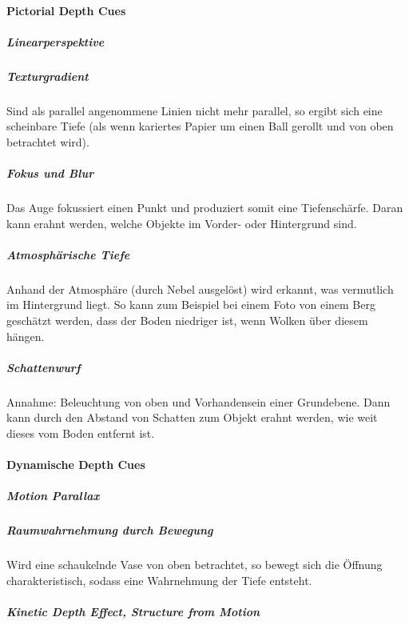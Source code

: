 				\paragraph{Pictorial Depth Cues}
					\subparagraph{Linearperspektive} %

					\subparagraph{Texturgradient}
						Sind als parallel angenommene Linien nicht mehr parallel, so ergibt sich eine scheinbare Tiefe (als wenn kariertes Papier um einen Ball gerollt und von oben betrachtet wird).

					\subparagraph{Fokus und Blur}
						Das Auge fokussiert einen Punkt und produziert somit eine Tiefenschärfe. Daran kann erahnt werden, welche Objekte im Vorder- oder Hintergrund sind.

					\subparagraph{Atmosphärische Tiefe}
						Anhand der Atmosphäre (\zB durch Nebel ausgelöst) wird erkannt, was vermutlich im Hintergrund liegt. So kann zum Beispiel bei einem Foto von einem Berg geschätzt werden, dass der Boden niedriger ist, wenn Wolken über diesem hängen.

					\subparagraph{Schattenwurf}
						Annahme: Beleuchtung von oben und Vorhandensein einer Grundebene. Dann kann durch den Abstand von Schatten zum Objekt erahnt werden, wie weit dieses vom Boden entfernt ist.

				\paragraph{Dynamische Depth Cues}
					\subparagraph{Motion Parallax} %

					\subparagraph{Raumwahrnehmung durch Bewegung}
						Wird \zB eine schaukelnde Vase von oben betrachtet, so bewegt sich die Öffnung charakteristisch, sodass eine Wahrnehmung der Tiefe entsteht.

					\subparagraph{Kinetic Depth Effect, Structure from Motion} %

